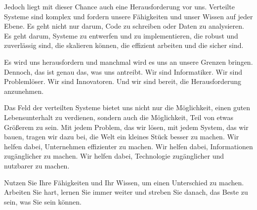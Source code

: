 Jedoch liegt mit dieser Chance auch eine Herausforderung vor uns. Verteilte Systeme sind komplex und fordern unsere Fähigkeiten und unser Wissen auf jeder Ebene. Es geht nicht nur darum, Code zu schreiben oder Daten zu analysieren. Es geht darum, Systeme zu entwerfen und zu implementieren, die robust und zuverlässig sind, die skalieren können, die effizient arbeiten und die sicher sind.

Es wird uns herausfordern und manchmal wird es uns an unsere Grenzen bringen. Dennoch, das ist genau das, was uns antreibt. Wir sind Informatiker. Wir sind Problemlöser. Wir sind Innovatoren. Und wir sind bereit, die Herausforderung anzunehmen.

Das Feld der verteilten Systeme bietet uns nicht nur die Möglichkeit, einen guten Lebensunterhalt zu verdienen, sondern auch die Möglichkeit, Teil von etwas Größerem zu sein. Mit jedem Problem, das wir lösen, mit jedem System, das wir bauen, tragen wir dazu bei, die Welt ein kleines Stück besser zu machen. Wir helfen dabei, Unternehmen effizienter zu machen. Wir helfen dabei, Informationen zugänglicher zu machen. Wir helfen dabei, Technologie zugänglicher und nutzbarer zu machen.

Nutzen Sie Ihre Fähigkeiten und Ihr Wissen, um einen Unterschied zu machen. Arbeiten Sie hart, lernen Sie immer weiter und streben Sie danach, das Beste zu sein, was Sie sein können. 
